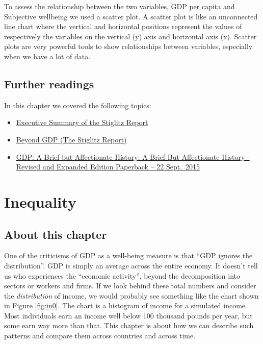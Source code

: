 \documentclass[
]{book}
\begin{document}
To assess the relationship between the two variables, GDP per capita and Subjective wellbeing we used a scatter plot. A scatter plot is like an unconnected line chart where the vertical and horizontal positions represent the values of respectively the variables on the vertical (y) axis and horizontal axis (x). Scatter plots are very powerful tools to show relationships between variables, especially when we have a lot of data.

\hypertarget{further-readings-3}{%
\section{Further readings}\label{further-readings-3}}

In this chapter we covered the following topics:

\begin{itemize}
\item
  \href{https://www.stat.si/doc/drzstat/Stiglitz\%20report.pdf}{Executive Summary of the Stiglitz Report}
\item
  \href{Beyond\%20GDP\%20Measuring\%20What\%20Counts\%20for\%20Economic\%20and\%20Social\%20Performance}{Beyond GDP (The Stiglitz Report)}
\item
  \href{https://press.princeton.edu/books/paperback/9780691169859/gdp}{GDP: A Brief but Affectionate History: A Brief But Affectionate History - Revised and Expanded Edition Paperback -- 22 Sept.~2015}
\end{itemize}

\hypertarget{inequality}{%
\chapter{Inequality}\label{inequality}}

\hypertarget{about-this-chapter-1}{%
\section{About this chapter}\label{about-this-chapter-1}}

One of the criticisms of GDP as a well-being measure is that ``GDP ignores the distribution''. GDP is simply an average across the entire economy. It doesn't tell us who experiences the ``economic activity'', beyond the decomposition into sectors or workers and firms. If we look behind these total numbers and consider the \emph{distribution} of income, we would probably see something like the chart shown in Figure \ref{fig:in0}. The chart is a histogram of income for a simulated income. Most individuals earn an income well below 100 thousand pounds per year, but some earn way more than that. This chapter is about how we can describe such patterns and compare them across countries and across time.
\end{document}

